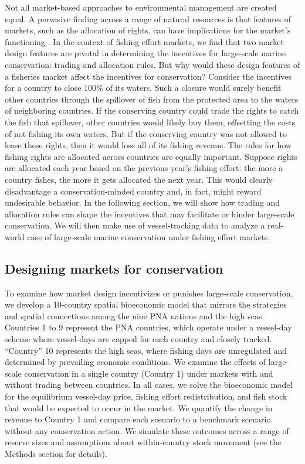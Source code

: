 \documentclass[12pt]{article}
\begin{document}
Not all market-based approaches to environmental management are created equal. A pervasive finding across a range of natural resources is that features of markets, such as the allocation of rights, can have implications for the market's functioning \cite{libecap_1989}. In the context of fishing effort markets, we find that two market design features are pivotal in determining the incentives for large-scale marine conservation: trading and allocation rules. But why would these design features of a fisheries market affect the incentives for conservation? Consider the incentives for a country to close 100\% of its waters. Such a closure would surely benefit other countries through the spillover of fish from the protected area to the waters of neighboring countries. If the conserving country could trade the rights to catch the fish that spillover, other countries would likely buy them, offsetting the costs of not fishing its own waters. But if the conserving country was not allowed to lease these rights, then it would lose all of its fishing revenue. The rules for how fishing rights are allocated across countries are equally important. Suppose rights are allocated each year based on the previous year's fishing effort: the more a country fishes, the more it gets allocated the next year. This would clearly disadvantage a conservation-minded country and, in fact, might reward undesirable behavior. In the following section, we will show how trading and allocation rules can shape the incentives that may facilitate or hinder large-scale conservation. We will then make use of vessel-tracking data to analyze a real-world case of large-scale marine conservation under fishing effort markets.

\subsection{Designing markets for conservation}

To examine how market design incentivizes or punishes large-scale conservation, we develop a 10-country spatial bioeconomic model that mirrors the strategies and spatial connections among the nine PNA nations and the high seas. Countries 1 to 9 represent the PNA countries, which operate under a vessel-day scheme where vessel-days are capped for each country and closely tracked. ``Country'' 10 represents the high seas, where fishing days are unregulated and determined by prevailing economic conditions. We examine the effects of large-scale conservation in a single country (Country 1) under markets with and without trading between countries. In all cases, we solve the bioeconomic model for the equilibrium vessel-day price, fishing effort redistribution, and fish stock that would be expected to occur in the market. We quantify the change in revenue to Country 1 and compare each scenario to a benchmark scenario without any conservation action. We simulate these outcomes across a range of reserve sizes and assumptions about within-country stock movement (see the Methods section for details).
\end{document}
